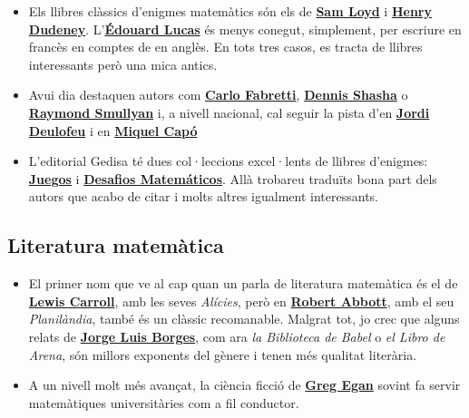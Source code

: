 \documentclass[a4paper, 12pt]{article}
\begin{document}
            \begin{itemize}
                \item Els llibres clàssics d'enigmes matemàtics són els de \href{https://ca.wikipedia.org/wiki/Sam_Loyd}{\textbf{Sam Loyd}} i \href{https://ca.wikipedia.org/wiki/Henry_Dudeney}{\textbf{Henry Dudeney}}. L'\href{https://ca.wikipedia.org/wiki/\%C3\%89douard_Lucas}{\textbf{Édouard Lucas}} és menys conegut, simplement, per escriure en francès en comptes de en anglès. En tots tres casos, es tracta de llibres interessants però una mica antics.
                \item Avui dia destaquen autors com \href{https://es.wikipedia.org/wiki/Carlo_Frabetti}{\textbf{Carlo Fabretti}}, \href{https://en.wikipedia.org/wiki/Dennis_Shasha}{\textbf{Dennis Shasha}} o \href{https://ca.wikipedia.org/wiki/Raymond_Smullyan}{\textbf{Raymond Smullyan}} i, a nivell nacional, cal seguir la pista d'en \href{https://gedisa.com/autor.aspx?codaut=1298}{\textbf{Jordi Deulofeu}} i en \href{https://www.casadellibro.com/libros-ebooks/miquel-capo-dolz/128544}{\textbf{Miquel Capó}}
                \item L'editorial Gedisa té dues col·leccions excel·lents de llibres d'enigmes: \href{https://www.gedisa.com/articulos.aspx?modo=c&fam=040}{\textbf{Juegos}} i \href{https://www.gedisa.com/articulos.aspx?modo=c&fam=1024}{\textbf{Desafios Matemáticos}}. Allà trobareu traduïts bona part dels autors que acabo de citar i molts altres igualment interessants.
            \end{itemize}

        \subsection*{Literatura matemàtica}

            \begin{itemize}
                \item El primer nom que ve al cap quan un parla de literatura matemàtica és el de \href{https://ca.wikipedia.org/wiki/Lewis_Carroll}{\textbf{Lewis Carroll}}, amb les seves \emph{Alícies}, però en \href{https://ca.wikipedia.org/wiki/Edwin_Abbott_Abbott}{\textbf{Robert Abbott}}, amb el seu \emph{Planilàndia}, també és un clàssic recomanable. Malgrat tot, jo crec que alguns relats de \href{https://ca.wikipedia.org/wiki/Jorge_Luis_Borges}{\textbf{Jorge Luis Borges}}, com ara \emph{la Biblioteca de Babel} o \emph{el Libro de Arena}, són millors exponents del gènere i tenen més qualitat literària.
                \item A un nivell molt més avançat, la ciència ficció de \href{https://es.wikipedia.org/wiki/Greg_Egan}{\textbf{Greg Egan}} sovint fa servir matemàtiques universitàries com a fil conductor.
            \end{itemize}
\end{document}
